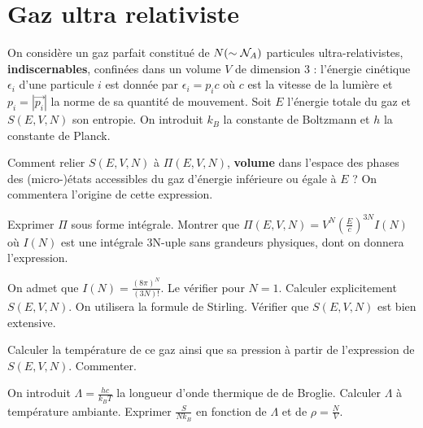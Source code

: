 \documentclass[utf8, 11pt]{feuille}
\begin{document}
\section{Gaz ultra relativiste}

On considère un gaz parfait constitué de $N (\sim {\cal N}_A)$ particules ultra-relativistes, {\bf indiscernables}, confinées dans un volume $V$ de dimension 3 : l'énergie cinétique $\epsilon_i$ d'une particule $i$ est donnée par $\epsilon_i= p_ic$ où $c$ est la vitesse de la lumière et $p_i=|\Vec{p_i}|$ la norme de sa quantité de mouvement. Soit $E$ l'énergie totale du gaz et $S(E,V,N)$ son entropie. On introduit $k_B$ la constante de Boltzmann et $h$ la constante de Planck.

\medskip

\question Comment relier $S(E,V,N)$ à $\Pi(E,V,N)$, {\bf volume} dans l'espace des phases des (micro-)états accessibles du gaz d'énergie inférieure ou égale à $E$ ? On commentera l'origine de cette expression.

\question Exprimer $\Pi$ sous forme intégrale. Montrer que $\Pi(E,V,N)=V^N (\frac{E}{c})^{3N} I(N)$ où $I(N)$ est une intégrale 3N-uple sans grandeurs physiques, dont on donnera l'expression.

\question On admet que $I(N)=\frac{(8 \pi)^N}{(3N)!}$. Le vérifier pour $N=1$. Calculer explicitement $S(E,V,N)$. On utilisera la formule de Stirling. Vérifier que $S(E,V,N)$ est bien extensive.

\question Calculer la température de ce gaz ainsi que sa pression à partir de l'expression de $S(E,V,N)$. Commenter.

\question On introduit $\Lambda=\frac{hc}{k_BT}$ la longueur d'onde thermique de de Broglie. Calculer $\Lambda$ à température ambiante. Exprimer $\frac{S}{N k_B}$ en fonction de $\Lambda$ et de $\rho=\frac{N}{V}$.
\end{document}
